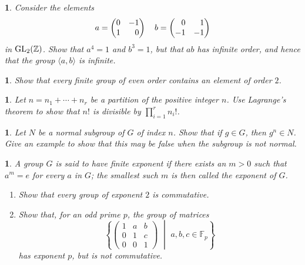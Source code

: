 \documentclass[a4paper,11pt,final,openany]{memoir}%
\newtheorem{exercise}[Y]{}
\theoremstyle{nonumberplain}
\begin{document}
\begin{exercise}
\label{x2} Consider the elements%
\[
a=%
\begin{pmatrix}
0 & -1\\
1 & \hfill\hfill0
\end{pmatrix}
\quad b=%
\begin{pmatrix}
\hfill0 & \hfill1\\
-1 & -1
\end{pmatrix}
\]
in $\operatorname{GL}_{2}(\mathbb{Z})$. Show that $a^{4}=1$ and $b^{3}=1$, but that $ab$ has
infinite order, and hence that the group $\langle a,b\rangle$ is infinite.

\end{exercise}

\begin{exercise}
\label{x3} Show that every finite group of even order contains an element of
order $2$.
\end{exercise}

\begin{exercise}
\label{x4d}Let $n=n_{1}+\cdots+n_{r}$ be a partition of the positive integer
$n$. Use Lagrange's theorem to show that $n!$ is divisible by $\prod
\nolimits_{i=1}^{r}n_{i}!$.
\end{exercise}

\begin{exercise}
\label{x4} Let $N$ be a normal subgroup of $G$ of index $n$. Show that if
$g\in G$, then $g^{n}\in N$. Give an example to show that this may be false
when the subgroup is not normal.
\end{exercise}

\begin{exercise}
\label{x4a} A group $G$ is said to have \emph{finite exponent}%
if there exists an $m>0$ such that $a^{m}=e$ for every $a$ in $G$; the
smallest such $m$ is then called the \emph{exponent} of $G$.

\begin{enumerate}
\item Show that every group of exponent $2$ is commutative.

\item Show that, for an odd prime $p$, the group of matrices
\[
\left\{
\begin{pmatrix}
1 & a & b\\
0 & 1 & c\\
0 & 0 & 1
\end{pmatrix}
\,\, \middle|\,\, a,b,c\in\mathbb{F}{}_{p}\right\}
\]
has exponent $p$, but is not commutative.
\end{enumerate}
\end{exercise}
\end{document}
